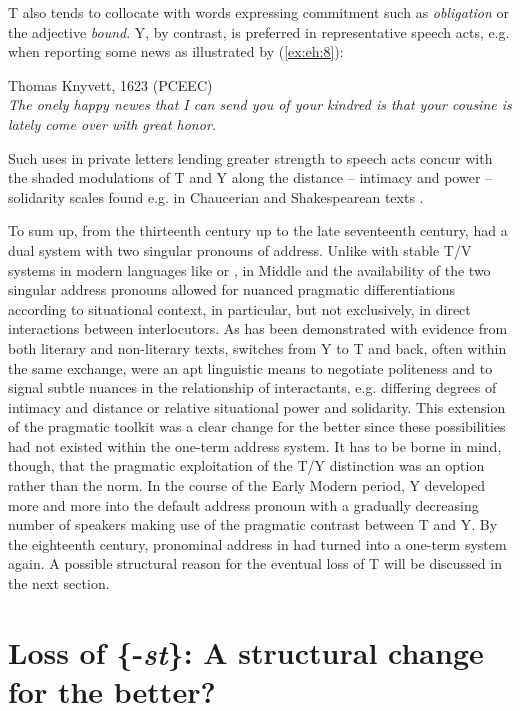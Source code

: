 \documentclass[output=paper,hidelinks]{langscibook}
\begin{document}
T also tends to collocate with words expressing commitment such as \textit{obligation} or the adjective \textit{bound}. Y, by contrast, is preferred in representative speech acts, e.g. when reporting some news as illustrated by (\ref{ex:eh:8}):

\ea \label{ex:eh:8} 
	Thomas Knyvett, 1623 (PCEEC)\\
	\textit{The onely happy newes that I can send \textit{you} of \textit{your} kindred is that \textit{your} cousine  is lately come over with great honor.}
\z

Such uses in private letters lending greater strength to speech acts concur with the shaded modulations of T and Y along the distance – intimacy and power – solidarity scales found e.g. in Chaucerian and Shakespearean texts \parencites[see][240]{Mazzon2003}[43 and  above]{Mazzon2009}.

To sum up, from the thirteenth century up to the late seventeenth century,  had a dual system with two singular pronouns of address. Unlike with stable T/V systems in modern languages like  or , in Middle and  the availability of the two singular address pronouns allowed for nuanced pragmatic differentiations according to situational context, in particular, but not exclusively, in direct interactions between interlocutors. As has been demonstrated with evidence from both literary and non-literary texts, switches from Y to T and back, often within the same exchange, were an apt linguistic means to negotiate politeness and to signal subtle nuances in the relationship of interactants, e.g. differing degrees of intimacy and distance or relative situational power and solidarity. This extension of the pragmatic toolkit was a clear change for the better since these possibilities had not existed within the one-term address system. It has to be borne in mind, though, that the pragmatic exploitation of the T/Y distinction was an option rather than the norm. In the course of the Early Modern period, Y developed more and more into the default address pronoun with a gradually decreasing number of speakers making use of the pragmatic contrast between T and Y. By the eighteenth century, pronominal address in  had turned into a one-term system again. A possible structural reason for the eventual loss of T will be discussed in the next section.


\section{Loss of \{-\textit{st}\}: A structural change for the better?}\label{sec:eh:5}
\end{document}
